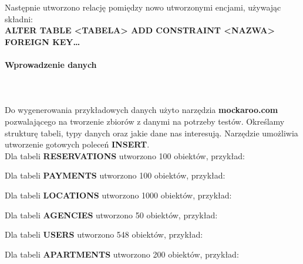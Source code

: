 \documentclass[polish, 11pt]{article}
\begin{document}
			    Następnie utworzono relację pomiędzy nowo utworzonymi encjami, używając składni:\\ 
			    {\bfseries ALTER TABLE <TABELA> ADD CONSTRAINT <NAZWA> FOREIGN KEY\dots}\\
			    
			    
		    
		    \paragraph{Wprowadzenie danych}\mbox{}\\\\
			    Do wygenerowania przykładowych danych użyto narzędzia {\bfseries mockaroo.com} pozwalającego na tworzenie zbiorów z danymi
			    na potrzeby testów. Określamy strukturę tabeli, typy danych oraz jakie dane nas interesują. Narzędzie umożliwia utworzenie
			    gotowych poleceń {\bfseries INSERT}.\\
			    
			    \noindent
			    Dla tabeli {\bfseries RESERVATIONS} utworzono 100 obiektów, przykład:
			    
			    
			    \vspace{0.5cm}\noindent
			    Dla tabeli {\bfseries PAYMENTS} utworzono 100 obiektów, przykład:
			    
			    
			    \vspace{0.5cm}\noindent
			    Dla tabeli {\bfseries LOCATIONS} utworzono 1000 obiektów, przykład:
			    
			    
			    \vspace{0.5cm}\noindent
			    Dla tabeli {\bfseries AGENCIES} utworzono 50 obiektów, przykład:
			    
			    
			    \vspace{0.5cm}\noindent
			    Dla tabeli {\bfseries USERS} utworzono 548 obiektów, przykład:
			    
			    
			    \vspace{0.5cm}\noindent
			    Dla tabeli {\bfseries APARTMENTS} utworzono 200 obiektów, przykład:
			    
		    
\end{document}
